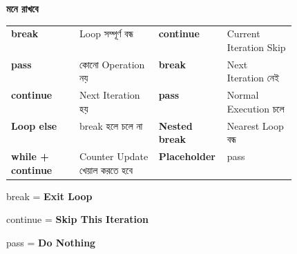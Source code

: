 
\begin{rememberbox}

\textbf{\color{deepOrange}মনে রাখবে}

\begin{tabularx}
{\linewidth}
{
>{\bfseries\RaggedRight\arraybackslash}p{0.24\linewidth}
Y
>{\bfseries\RaggedRight\arraybackslash}p{0.24\linewidth}
Y
}

\textenglish{\ttfamily break}
&
Loop সম্পূর্ণ বন্ধ
&
\textenglish{\ttfamily continue}
&
Current Iteration Skip
\\[0.5mm]

\textenglish{\ttfamily pass}
&
কোনো Operation নয়
&
\textenglish{\ttfamily break}
&
Next Iteration নেই
\\[0.5mm]

\textenglish{\ttfamily continue}
&
Next Iteration হয়
&
\textenglish{\ttfamily pass}
&
Normal Execution চলে
\\[0.5mm]

Loop \textenglish{\ttfamily else}
&
\textenglish{\ttfamily break}
হলে চলে না
&
Nested \textenglish{\ttfamily break}
&
Nearest Loop বন্ধ
\\[0.5mm]

\textenglish{\ttfamily while + continue}
&
Counter Update খেয়াল করতে হবে
&
Placeholder
&
\textenglish{\ttfamily pass}
\\

\end{tabularx}

\medskip

\begin{center}

\textenglish{\ttfamily break}
=
\textbf{Exit Loop}

\qquad

\textenglish{\ttfamily continue}
=
\textbf{Skip This Iteration}

\qquad

\textenglish{\ttfamily pass}
=
\textbf{Do Nothing}

\end{center}

\end{rememberbox}

\small


